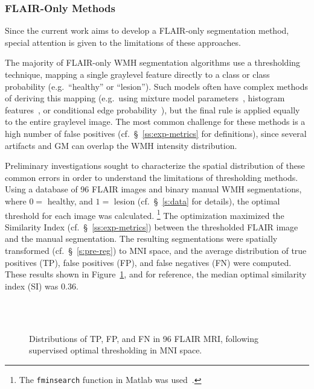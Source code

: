 \subsubsection{FLAIR-Only Methods}\label{sss:limits-flair}
Since the current work aims to develop a FLAIR-only segmentation method,
special attention is given to the limitations of these approaches.
\par
The majority of FLAIR-only WMH segmentation algorithms use a thresholding technique,
mapping a single graylevel feature directly to a class or class probability
(e.g.\ ``healthy'' or ``lesion'').
Such models often have complex methods of deriving this mapping (e.g.\ 
using mixture model parameters~\cite{Roura2015},
histogram features~\cite{Yoo2014},
or conditional edge probability~\cite{Knight2016}),
but the final rule is applied equally to the entire graylevel image.
The most common challenge for these methods is a high number of false positives
(cf.~\S~\ref{ss:exp-metrics} for definitions),
since several artifacts and GM can overlap the WMH intensity distribution.
\par
Preliminary investigations sought to characterize the spatial distribution of these common errors
in order to understand the limitations of thresholding methods.
Using a database of 96 FLAIR images and binary manual WMH segmentations,
where $0 =$ healthy, and $1 =$ lesion
(cf.~\S~\ref{s:data} for details),
the optimal threshold for each image was calculated.%
\footnote{The \texttt{fminsearch} function in Matlab was used~\cite{Lagarias1998}.}
The optimization maximized the Similarity Index (cf.~\S~\ref{ss:exp-metrics})
between the thresholded FLAIR image and the manual segmentation.
The resulting segmentations were spatially transformed (cf.~\S~\ref{s:pre-reg})
to MNI space, and the average distribution of
true positives (TP), false positives (FP), and false negatives (FN)
were computed.
These results shown in Figure~\ref{fig:tpfpfn-thropt},
and for reference, the median optimal similarity index (SI) was 0.36.
\begin{figure}
  \centering
  \\[0.5em]
  \\[0.5em]
  \caption{Distributions of TP, FP, and FN in 96 FLAIR MRI,
    following supervised optimal thresholding in MNI space.}%
  \label{fig:tpfpfn-thropt}
\end{figure}
